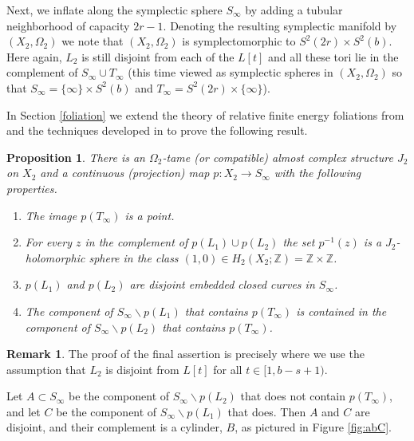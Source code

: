\documentclass[12pt]{amsart}
\newtheorem{proposition}[theorem]{Proposition}
\theoremstyle{definition}
\newtheorem{remark}[theorem]{Remark}
\newcommand{\ZZ}{{\mathbb Z}}
\begin{document}
\bigskip
{}
Next, we inflate along the symplectic sphere $S_{\infty}$ by adding a tubular neighborhood of capacity $2r-1$. Denoting the resulting symplectic manifold by $(X_2, \Omega_2)$ we note that $(X_2, \Omega_2)$ is symplectomorphic to $S^2(2r) \times S^2(b)$. 
Here again, $L_2$ is still disjoint from each of the $L[t]$ and all these tori lie in the complement of $S_{\infty} \cup T_{\infty}$ (this time viewed as symplectic spheres in $(X_2,\Omega_2)$ so that $S_{\infty} = \{\infty\} \times S^2(b)$ and $T_{\infty} = S^2(2r) \times \{\infty\}$).

In Section \ref{foliation} we extend the theory of relative finite energy foliations from \cite{rgi} and the techniques developed in \cite{hiker,boust} to prove the following result.

\begin{proposition}\label{prop:proj} There is an $\Omega_2$-tame (or compatible) almost complex structure $J_2$ on $X_2$  and a continuous (projection) map $p \colon X_2 \to S_{\infty}$ with the following properties.
\begin{enumerate}
    \item The image $p(T_{\infty})$ is a point.\\
    \item For every $z$ in the complement of $p(L_1) \cup p(L_2)$ the set $p^{-1}(z)$ is a $J_2$-holomorphic sphere in the class $(1,0) \in H_2(X_2;\ZZ) = \ZZ \times \ZZ$.\\
    \item $p(L_1)$ and $p(L_2)$ are disjoint embedded closed curves in $S_{\infty}$.\\
    \item The component of $S_\infty \smallsetminus p(L_1)$ that contains $p(T_\infty)$ is contained in the component of $S_\infty \smallsetminus p(L_2)$ that contains $p(T_\infty)$.
\end{enumerate}
\end{proposition}

\begin{remark} The proof of the final assertion is precisely where we use the assumption that $L_2$ is disjoint from $L[t]$ for all $t \in [1,b-s+1)$.
\end{remark}

Let $A \subset S_\infty$ be the component of $S_\infty \smallsetminus p(L_2)$ that does not contain $p(T_\infty)$, and let $C$ be the component of $S_\infty \smallsetminus p(L_1)$ that does. Then $A$ and $C$ are disjoint, and their complement is a cylinder, $B$, as pictured in Figure \ref{fig:abC}.  
\end{document}
